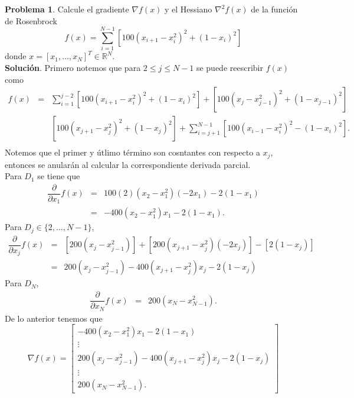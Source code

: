 \documentclass[12pt,letterpaper]{article}
\theoremstyle{definition}
\newtheorem{problm}{Problema}
\begin{document}
\begin{problm}
	Calcule el gradiente $ \nabla f(x) $ y el Hessiano $ \nabla^2 f(x) $ de la función de Rosenbrock
	\[ f(x) = \sum_{i = 1}^{N-1} [100(x_{i+1} - x_i^2)^2 + (1 - x_i)^2] \]
	donde $ x = [ x_1, \dots, x_N ]^T \in\mathbb{R}^N $.
	\\
	\textbf{Solución}.  Primero notemos que  para $ 2 \leq j \leq N-1 $ se puede reescribir $ f(x) $ como
	\begin{eqnarray*}
		f(x) & = & \sum_{i = 1}^{j-2}  [100(x_{i+1}- x_i^2)^2 + (1-x_i)^2] + [100(x_{j} - x_{j-1}^2)^2 + (1-x_{j-1})^2] \\
			 &   & [100(x_{j+1} - x_{j}^2)^2 + (1-x_{j})^2] +  \sum_{i = j+1}^{N-1} [100(x_{i-1} - x_i^2)^2 - (1-x_i)^2 ]. \\
	\end{eqnarray*}
	Notemos que el primer y útlimo término son cosntantes con respecto a $ x_j $, entonces se anularán al calcular la correspondiente derivada parcial.
	\\
	Para $ D_1 $ se tiene que
	\begin{eqnarray*}
		\dfrac{\partial }{\partial x_1} f(x) & = & 100(2)(x_2 - x_1^2) (-2x_1) - 2(1-x_1)  \\
										     & = &  -400(x_2 - x_1^2)x_1 - 2(1-x_1).
	\end{eqnarray*}
	Para $ D_j \in\{ 2, \dots, N-1 \} $,
	\begin{eqnarray*}
		\dfrac{\partial }{\partial x_j} f(x) & = & [200(x_j - x_{j-1}^2)] + [ 200(x_{j+1} - x_j^2)(-2x_j)] - [2(1-x_j) ] \\
		   									 & = & 200(x_j - x_{j-1}^2) - 400 (x_{j+1} - x_j^2) x_j - 2(1-x_j)
	\end{eqnarray*}
	Para $ D_N $, 
	\begin{eqnarray*}
		\dfrac{\partial }{\partial x_N} f(x) & = & 200(x_N - x_{N-1}^2).
	\end{eqnarray*}
	De lo anterior tenemos que
	\begin{equation}
		\nabla f(x)  =  \left[\begin{matrix}
								-400(x_2 - x_1^2) x_1 - 2(1-x_1) \\
								\vdots							 \\
								200(x_j - x_{j-1}^2) - 400(x_{j+1} - x_j^2)x_j - 2(1-x_j)					 \\
								\vdots  						 \\
								200(x_N - x_{N-1}^2).
		\end{matrix}\right]
	\end{equation}

\end{problm}
\end{document}
